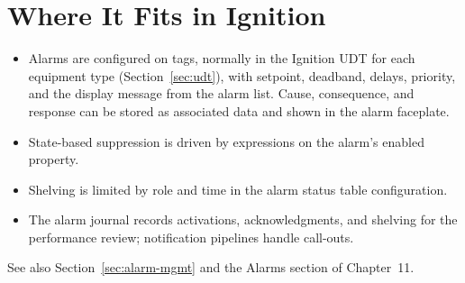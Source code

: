 \section{Where It Fits in Ignition}
\begin{itemize}[itemsep=1pt]
  \item Alarms are configured on tags, normally in the Ignition UDT for each equipment type (Section~\ref{sec:udt}), with setpoint, deadband, delays, priority, and the display message from the alarm list. Cause, consequence, and response can be stored as associated data and shown in the alarm faceplate.
  \item State-based suppression is driven by expressions on the alarm's enabled property.
  \item Shelving is limited by role and time in the alarm status table configuration.
  \item The alarm journal records activations, acknowledgments, and shelving for the performance review; notification pipelines handle call-outs.
\end{itemize}
See also Section~\ref{sec:alarm-mgmt} and the Alarms section of Chapter~11.
